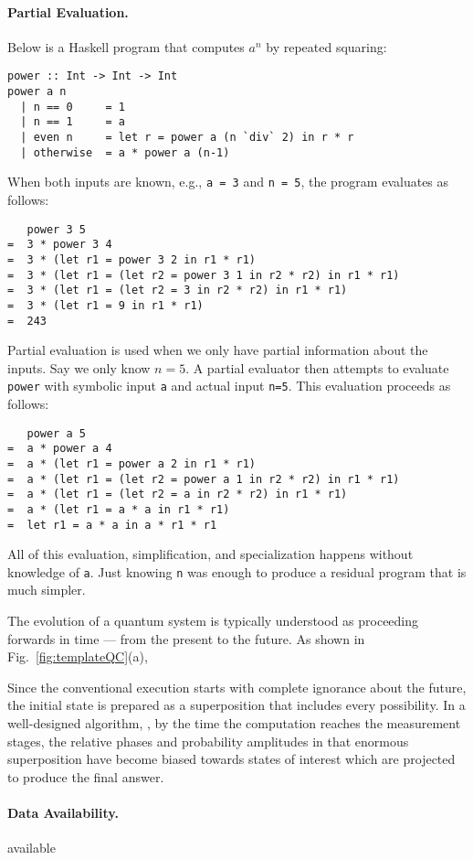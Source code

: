 \documentclass{article}
\begin{document}
\begin{refsection}
\paragraph*{Partial Evaluation.}
Below is a Haskell program that computes $a^n$ by repeated squaring:
\begin{verbatim}
power :: Int -> Int -> Int
power a n
  | n == 0     = 1
  | n == 1     = a
  | even n     = let r = power a (n `div` 2) in r * r 
  | otherwise  = a * power a (n-1)
\end{verbatim}
When both inputs are known, e.g., \verb|a = 3| and \verb|n = 5|, the
program evaluates as follows:
\begin{verbatim}
   power 3 5
=  3 * power 3 4
=  3 * (let r1 = power 3 2 in r1 * r1)
=  3 * (let r1 = (let r2 = power 3 1 in r2 * r2) in r1 * r1)
=  3 * (let r1 = (let r2 = 3 in r2 * r2) in r1 * r1)
=  3 * (let r1 = 9 in r1 * r1)
=  243
\end{verbatim}

Partial evaluation is used when we only have partial information about
the inputs. Say we only know $n=5$. A partial evaluator then attempts
to evaluate \verb|power| with symbolic input \verb|a| and actual input
\verb|n=5|. This evaluation proceeds as follows:
\begin{verbatim}
   power a 5 
=  a * power a 4 
=  a * (let r1 = power a 2 in r1 * r1)
=  a * (let r1 = (let r2 = power a 1 in r2 * r2) in r1 * r1)
=  a * (let r1 = (let r2 = a in r2 * r2) in r1 * r1)
=  a * (let r1 = a * a in r1 * r1)
=  let r1 = a * a in a * r1 * r1
\end{verbatim}
All of this evaluation, simplification, and specialization happens
without knowledge of \verb|a|. Just knowing \verb|n| was enough to
produce a residual program that is much simpler. 

The evolution of a quantum system is typically understood as
proceeding forwards in time --- from the present to the future. As
shown in Fig.~\ref{fig:templateQC}(a), 

Since the conventional execution starts with complete ignorance about
the future, the initial state is prepared as a superposition that
includes every possibility. In a well-designed algorithm, , by the
time the computation reaches the measurement stages, the relative
phases and probability amplitudes in that enormous superposition have
become biased towards states of interest which are projected to
produce the final answer.

\paragraph*{Data Availability.} available 


\end{refsection}
\end{document}
